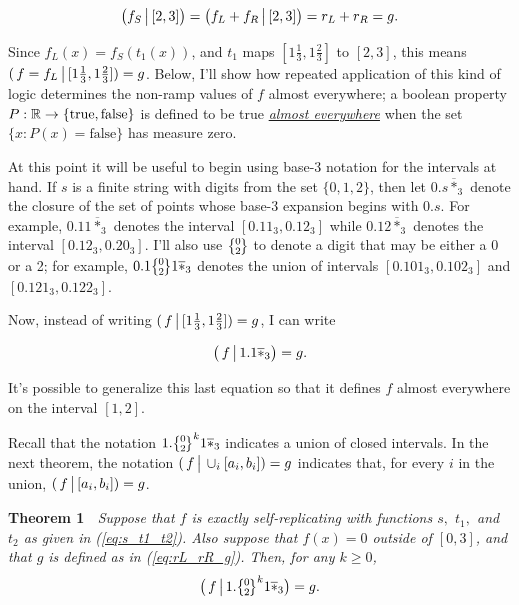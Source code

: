 \documentclass[20pt,]{extarticle}
\begin{document}
\[\big(f_S \,\big|\, [2,3]\big) = \big(f_L + f_R \,\big|\, [2, 3]\big) =
r_L + r_R = g.\]

Since \(f_L(x) = f_S(t_1(x))\), and \(t_1\) maps
\([1\tfrac{1}{3}, 1\tfrac{2}{3}]\) to \([2,3]\), this means
\((\,f=f_L \,\big|\, [1\tfrac{1}{3}, 1\tfrac{2}{3}]) = g\). Below, I'll
show how repeated application of this kind of logic determines the
non-ramp values of \(f\) almost everywhere; a boolean property
\(P:\mathbb{R}\to\{\text{true},\text{false}\}\) is defined to be true
\href{https://en.wikipedia.org/wiki/Almost_everywhere}{\emph{almost
everywhere}} when the set \(\{x : P(x) = \text{false}\}\) has measure
zero.

\newcommand{\zerotwo}{\big\{\!\raise1.5pt\hbox{$\genfrac{}{}{0pt}{}
{\lower1.8pt\hbox{$\smash{\scriptstyle 0}$}}
{\lower1pt\hbox{$\smash{\scriptstyle 2}$}}$}\!\big\}}

\newcommand{\lstar}{\overline{*}_3}

At this point it will be useful to begin using base-3 notation for the
intervals at hand. If \(s\) is a finite string with digits from the set
\(\{0, 1, 2\}\), then let \(0.s\lstar\) denote the closure of the set of
points whose base-3 expansion begins with \(0.s\). For example,
\(0.11\lstar\) denotes the interval \([0.11_3, 0.12_3]\) while
\(0.12\lstar\) denotes the interval \([0.12_3, 0.20_3]\). I'll also use
\(\zerotwo\) to denote a digit that may be either a 0 or a 2; for
example, \(0.1\zerotwo 1\lstar\) denotes the union of intervals
\([0.101_3, 0.102_3]\) and \([0.121_3, 0.122_3]\).

Now, instead of writing
\((\,f \,\big|\, [1\tfrac{1}{3}, 1\tfrac{2}{3}]) = g\), I can write

\begin{equation}\big(\,f \restrict 1.1\lstar\big) = g.\label{eq:nonpl_base_case}\end{equation}

It's possible to generalize this last equation so that it defines \(f\)
almost everywhere on the interval \([1, 2]\).

Recall that the notation \(1.\zerotwo^k1\lstar\) indicates a union of
closed intervals. In the next theorem, the notation
\((\,f \,\big|\, \cup_i [a_i,b_i]) = g\) indicates that, for every \(i\)
in the union, \((\,f \,\big|\, [a_i,b_i]) = g\).

\textbf{Theorem 1} \(\;\) \emph{Suppose that \(f\) is exactly
self-replicating with functions \(s,\) \(t_1,\) and \(t_2\) as given in
(\ref{eq:s_t1_t2}). Also suppose that \(f(x) = 0\) outside of \([0,3]\),
and that \(g\) is defined as in (\ref{eq:rL_rR_g}). Then, for any
\(k\ge 0\), \[\big(\,f \restrict 1.\zerotwo^k1\lstar\big)=g.\]}
\end{document}

